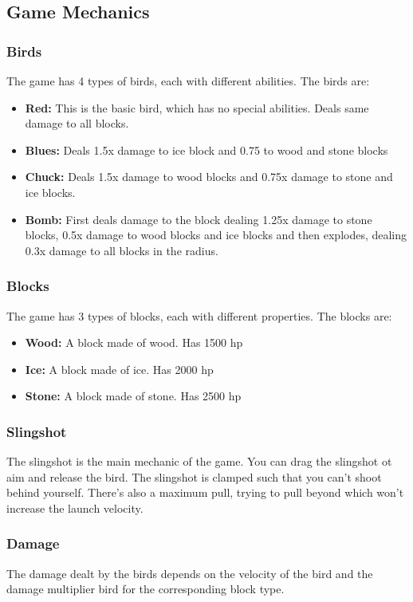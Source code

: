 \documentclass[10pt]{article}
\begin{document}
\subsection{Game Mechanics}\label{subsec:Game Mechanics}
\subsubsection{Birds}
The game has 4 types of birds, each with different abilities. The birds are:
\begin{itemize}
    \item \textbf{Red:} This is the basic bird, which has no special abilities. Deals same damage to all blocks.
    \item \textbf{Blues:} Deals 1.5x damage to ice block and 0.75 to wood and stone blocks
    \item \textbf{Chuck:} Deals 1.5x damage to wood blocks and 0.75x damage to stone and ice blocks.
    \item \textbf{Bomb:} First deals damage to the block dealing 1.25x damage to stone blocks, 0.5x damage to wood blocks and ice blocks and then explodes, dealing 0.3x damage to all blocks in the radius.
\end{itemize}

\subsubsection{Blocks}
The game has 3 types of blocks, each with different properties. The blocks are:
\begin{itemize}
    \item \textbf{Wood:} A block made of wood. Has 1500 hp
    \item \textbf{Ice:} A block made of ice. Has 2000 hp
    \item \textbf{Stone:} A block made of stone. Has 2500 hp
\end{itemize}

\subsubsection{Slingshot}
The slingshot is the main mechanic of the game. You can drag the slingshot ot aim and release the bird. 
The slingshot is clamped such that you can't shoot behind yourself. 
There's also a maximum pull, trying to pull beyond which won't increase the launch velocity.

\subsubsection{Damage}
The damage dealt by the birds depends on the velocity of the bird and the damage multiplier bird for the corresponding block type.
\end{document}
